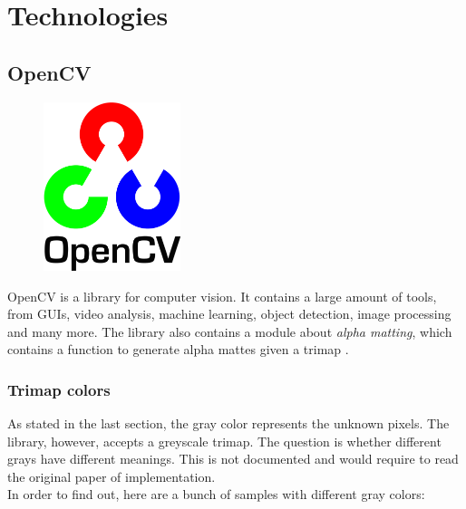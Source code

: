 \documentclass[a4paper]{article}
\begin{document}
\pagebreak

\section{Technologies}

\subsection{OpenCV}

\begin{figure}
    \includegraphics[width=4cm]{opencvlogo.png}
\end{figure}

OpenCV\cite{opencv} is a library
for computer vision. It contains a large
amount of tools, from GUIs, video analysis, machine learning,
object detection, image processing and many more\cite{opencvdoc}.
The library also contains a module about \textit{alpha matting},
which contains a function to generate alpha mattes given a trimap
\cite{opencvalphamatting}.

\subsubsection{Trimap colors}

As stated in the last section, the gray color represents the unknown pixels.
The library, however, accepts a greyscale trimap.
The question is whether different grays have different meanings.
This is not documented and would require to read the original
paper of implementation. \\ %
In order to find out, here are a bunch of samples with different gray
colors:

\wrapfill
\end{document}
